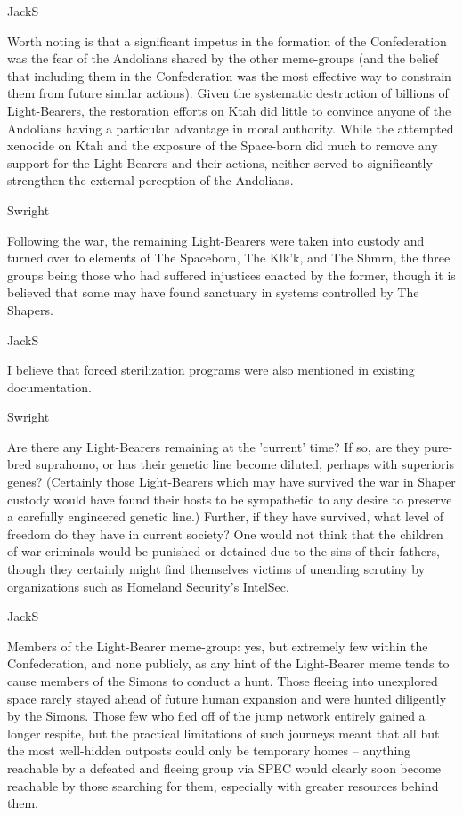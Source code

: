 JackS
	
Worth noting is that a significant impetus in the formation of the
Confederation was the fear of the Andolians shared by the other
meme-groups (and the belief that including them in the Confederation
was the most effective way to constrain them from future similar
actions). Given the systematic destruction of billions of
Light-Bearers, the restoration efforts on Ktah did little to convince
anyone of the Andolians having a particular advantage in moral
authority. While the attempted xenocide on Ktah and the exposure of
the Space-born did much to remove any support for the Light-Bearers
and their actions, neither served to significantly strengthen the
external perception of the Andolians.

Swright

Following the war, the remaining Light-Bearers were taken into custody
and turned over to elements of The Spaceborn, The Klk'k, and The
Shmrn, the three groups being those who had suffered injustices
enacted by the former, though it is believed that some may have found
sanctuary in systems controlled by The Shapers.

JackS

I believe that forced sterilization programs were also mentioned in
existing documentation.

Swright

Are there any Light-Bearers remaining at the 'current' time? If so,
are they pure-bred suprahomo, or has their genetic line become
diluted, perhaps with superioris genes? (Certainly those Light-Bearers
which may have survived the war in Shaper custody would have found
their hosts to be sympathetic to any desire to preserve a carefully
engineered genetic line.) Further, if they have survived, what level
of freedom do they have in current society? One would not think that
the children of war criminals would be punished or detained due to the
sins of their fathers, though they certainly might find themselves
victims of unending scrutiny by organizations such as Homeland
Security's IntelSec.

JackS
	
Members of the Light-Bearer meme-group: yes, but extremely few within
the Confederation, and none publicly, as any hint of the Light-Bearer
meme tends to cause members of the Simons to conduct a hunt. Those
fleeing into unexplored space rarely stayed ahead of future human
expansion and were hunted diligently by the Simons. Those few who fled
off of the jump network entirely gained a longer respite, but the
practical limitations of such journeys meant that all but the most
well-hidden outposts could only be temporary homes -- anything
reachable by a defeated and fleeing group via SPEC would clearly soon
become reachable by those searching for them, especially with greater
resources behind them.

